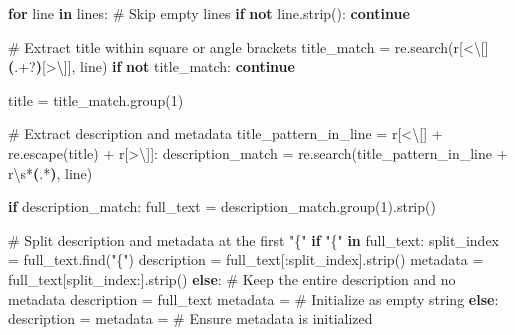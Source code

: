 \documentclass[
  11pt,
  letterpaper,
]{book}
\newenvironment{Shaded}{\begin{snugshade}}{\end{snugshade}}
\newcommand{\CharTok}[1]{\textcolor[rgb]{0.13,0.47,0.30}{#1}}
\newcommand{\CommentTok}[1]{\textcolor[rgb]{0.37,0.37,0.37}{#1}}
\newcommand{\ControlFlowTok}[1]{\textcolor[rgb]{0.00,0.23,0.31}{\textbf{#1}}}
\newcommand{\DecValTok}[1]{\textcolor[rgb]{0.68,0.00,0.00}{#1}}
\newcommand{\KeywordTok}[1]{\textcolor[rgb]{0.00,0.23,0.31}{\textbf{#1}}}
\newcommand{\NormalTok}[1]{\textcolor[rgb]{0.00,0.23,0.31}{#1}}
\newcommand{\OperatorTok}[1]{\textcolor[rgb]{0.37,0.37,0.37}{#1}}
\newcommand{\PreprocessorTok}[1]{\textcolor[rgb]{0.68,0.00,0.00}{#1}}
\newcommand{\StringTok}[1]{\textcolor[rgb]{0.13,0.47,0.30}{#1}}
\newcommand{\VerbatimStringTok}[1]{\textcolor[rgb]{0.13,0.47,0.30}{#1}}
\begin{document}
\begin{Shaded}
\begin{Highlighting}[]
    \ControlFlowTok{for}\NormalTok{ line }\KeywordTok{in}\NormalTok{ lines:}
        \CommentTok{\# Skip empty lines}
        \ControlFlowTok{if} \KeywordTok{not}\NormalTok{ line.strip():}
            \ControlFlowTok{continue}

        \CommentTok{\# Extract title within square or angle brackets}
\NormalTok{        title\_match }\OperatorTok{=}\NormalTok{ re.search(}\VerbatimStringTok{r\textquotesingle{}}\PreprocessorTok{[\textless{}}\CharTok{\textbackslash{}[}\PreprocessorTok{]}\KeywordTok{(}\DecValTok{.}\OperatorTok{+?}\KeywordTok{)}\PreprocessorTok{[\textgreater{}}\CharTok{\textbackslash{}]}\PreprocessorTok{]}\VerbatimStringTok{\textquotesingle{}}\NormalTok{, line)}
        \ControlFlowTok{if} \KeywordTok{not}\NormalTok{ title\_match:}
            \ControlFlowTok{continue}

\NormalTok{        title }\OperatorTok{=}\NormalTok{ title\_match.group(}\DecValTok{1}\NormalTok{)}

        \CommentTok{\# Extract description and metadata}
\NormalTok{        title\_pattern\_in\_line }\OperatorTok{=} \VerbatimStringTok{r\textquotesingle{}}\PreprocessorTok{[\textless{}}\CharTok{\textbackslash{}[}\PreprocessorTok{]}\VerbatimStringTok{\textquotesingle{}} \OperatorTok{+}\NormalTok{ re.escape(title) }\OperatorTok{+} \VerbatimStringTok{r\textquotesingle{}}\PreprocessorTok{[\textgreater{}}\CharTok{\textbackslash{}]}\PreprocessorTok{]}\VerbatimStringTok{:\textquotesingle{}}
\NormalTok{        description\_match }\OperatorTok{=}\NormalTok{ re.search(title\_pattern\_in\_line }\OperatorTok{+} \VerbatimStringTok{r\textquotesingle{}}\DecValTok{\textbackslash{}s}\OperatorTok{*}\KeywordTok{(}\DecValTok{.}\OperatorTok{*}\KeywordTok{)}\VerbatimStringTok{\textquotesingle{}}\NormalTok{, line)}

        \ControlFlowTok{if}\NormalTok{ description\_match:}
\NormalTok{            full\_text }\OperatorTok{=}\NormalTok{ description\_match.group(}\DecValTok{1}\NormalTok{).strip()}

            \CommentTok{\# Split description and metadata at the first "\{"}
            \ControlFlowTok{if} \StringTok{"\{"} \KeywordTok{in}\NormalTok{ full\_text:}
\NormalTok{                split\_index }\OperatorTok{=}\NormalTok{ full\_text.find(}\StringTok{"\{"}\NormalTok{)}
\NormalTok{                description }\OperatorTok{=}\NormalTok{ full\_text[:split\_index].strip()}
\NormalTok{                metadata }\OperatorTok{=}\NormalTok{ full\_text[split\_index:].strip()}
            \ControlFlowTok{else}\NormalTok{:}
                \CommentTok{\# Keep the entire description and no metadata}
\NormalTok{                description }\OperatorTok{=}\NormalTok{ full\_text}
\NormalTok{                metadata }\OperatorTok{=} \StringTok{\textquotesingle{}\textquotesingle{}}  \CommentTok{\# Initialize as empty string}
        \ControlFlowTok{else}\NormalTok{:}
\NormalTok{            description }\OperatorTok{=} \StringTok{\textquotesingle{}\textquotesingle{}}
\NormalTok{            metadata }\OperatorTok{=} \StringTok{\textquotesingle{}\textquotesingle{}}  \CommentTok{\# Ensure metadata is initialized}


\end{Highlighting}
\end{Shaded}
\end{document}
